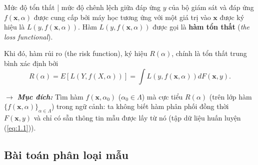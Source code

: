 Mức độ tổn thất | mức độ chênh lệch giữa đáp ứng $y$ của bộ giám sát và đáp ứng $f(\bm{x}, \alpha)$ được cung cấp bởi máy học tương ứng với một giá trị vào $\bm{x}$ được ký hiệu là $L(y, f(\bm{x}, \alpha))$. Hàm $L(y, f(\bm{x}, \alpha))$ được gọi là \textbf{hàm tổn thất} (\textit{the loss functional}).

Khi đó, hàm rủi ro (the risk function), ký hiệu $R(\alpha)$, chính là tổn thất trung bình xác định bởi
\begin{equation}
	R(\alpha) = E[L(Y, f(X, \alpha))] = \int L(y, f(\bm{x}, \alpha)) dF(\bm{x}, y).
\end{equation}

$\rightarrow$ \textit{\textbf{Mục đích:}} Tìm hàm $f(\bm{x}, \alpha_0)$ ($\alpha_0 \in \Lambda$) mà cực tiểu $R(\alpha)$ (trên lớp hàm $\{f(\bm{x}, \alpha)\}_{\alpha \in \Lambda}$) trong ngữ cảnh: ta không biết hàm phân phối đồng thời $F(\bm{x}, y)$ và chỉ có sẵn thông tin mẫu được lấy từ nó (tập dữ liệu huấn luyện (\ref{eq:1.1})).


\subsection{Bài toán phân loại mẫu}


